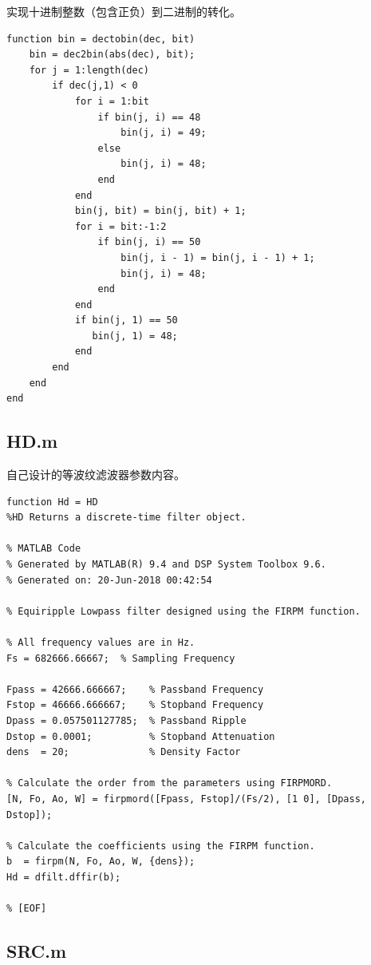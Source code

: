 \begin{spacing}{1.5}
实现十进制整数（包含正负）到二进制的转化。

\begin{lstlisting}
function bin = dectobin(dec, bit)
    bin = dec2bin(abs(dec), bit);
    for j = 1:length(dec)
        if dec(j,1) < 0
            for i = 1:bit
                if bin(j, i) == 48
                    bin(j, i) = 49;
                else
                    bin(j, i) = 48;
                end
            end
            bin(j, bit) = bin(j, bit) + 1;
            for i = bit:-1:2
                if bin(j, i) == 50
                    bin(j, i - 1) = bin(j, i - 1) + 1;
                    bin(j, i) = 48;
                end
            end
            if bin(j, 1) == 50
               bin(j, 1) = 48;
            end
        end
    end   
end
\end{lstlisting}

\subsection{HD.m}

自己设计的等波纹滤波器参数内容。

\begin{lstlisting}
function Hd = HD
%HD Returns a discrete-time filter object.

% MATLAB Code
% Generated by MATLAB(R) 9.4 and DSP System Toolbox 9.6.
% Generated on: 20-Jun-2018 00:42:54

% Equiripple Lowpass filter designed using the FIRPM function.

% All frequency values are in Hz.
Fs = 682666.66667;  % Sampling Frequency

Fpass = 42666.666667;    % Passband Frequency
Fstop = 46666.666667;    % Stopband Frequency
Dpass = 0.057501127785;  % Passband Ripple
Dstop = 0.0001;          % Stopband Attenuation
dens  = 20;              % Density Factor

% Calculate the order from the parameters using FIRPMORD.
[N, Fo, Ao, W] = firpmord([Fpass, Fstop]/(Fs/2), [1 0], [Dpass, Dstop]);

% Calculate the coefficients using the FIRPM function.
b  = firpm(N, Fo, Ao, W, {dens});
Hd = dfilt.dffir(b);

% [EOF]
\end{lstlisting}

\subsection{SRC.m}


\end{spacing}
